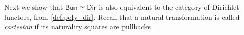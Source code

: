 \documentclass[11pt, article, one side]{memoir}
\theoremstyle{theorem}
\theoremstyle{definition}
\theoremstyle{remark}
\newtheorem{remark}[section]{Remark}
\newcommand{\Cat}[1]{\mathsf{#1}}%
\newcommand{\tn}[1]{\textnormal{#1}}
\newcommand{\cont}{\Cat{Cont}}
\newcommand{\bun}{\Cat{Bun}}
\newcommand{\dir}{\Cat{Dir}}
\begin{document}
%
%
 Next we show that $\bun\simeq\dir$ is also equivalent to the category of Dirichlet functors, from \cref{def.poly_dir}. Recall that a natural transformation is called \emph{cartesian} if its naturality squares are pullbacks.
\end{document}
